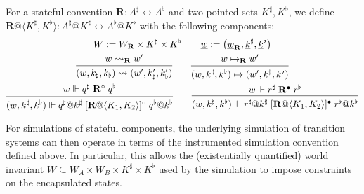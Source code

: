 \documentclass[acmsmall,screen,review,anonymous]{acmart}
\newcommand{\que}{\circ}
\newcommand{\ans}{\bullet}
\newcommand{\intl}[1]{\underline{#1}}
\begin{document}
\begin{definition} \label{def:liftsconv} %
For a stateful convention
$\mathbf{R} : A^\sharp \leftrightarrow A^\flat$
and two pointed sets $K^\sharp, K^\flat$, 
we define %
$\mathbf{R}@\langle K^\sharp,K^\flat \rangle :
   A^\sharp@K^\sharp \leftrightarrow A^\flat@K^\flat$
with the following components:
\begin{gather*}
  W := W_\mathbf{R} \times K^\sharp \times K^\flat
  \qquad
  \intl{w} := \big( \intl{w}_\mathbf{R}, \intl{k}^\sharp, \intl{k}^\flat \big)
  \\
 {\begin{prooftree}
    \hypo{w \leadsto_\mathbf{R} w'}
    \infer1{(w, k_\sharp, k_\flat) \leadsto (w', k_\sharp', k_\flat')}
  \end{prooftree}}
  \qquad
 {\begin{prooftree}
    \hypo{w \mapsto_\mathbf{R} w'}
    \infer1{(w, k^\sharp, k^\flat) \mapsto (w', k^\sharp, k^\flat)}
  \end{prooftree}}
  \\
 {\begin{prooftree}
    \hypo{w \Vdash q^\sharp \mathrel{\mathbf{R}^\que}
                   q^\flat}
    \infer1{
      (w, k^\sharp, k^\flat) \Vdash
      q^\sharp@k^\sharp
      \mathrel{[\mathbf{R}@\langle K_1, K_2 \rangle]^\que}
      q^\flat@k^\flat}
  \end{prooftree}}
  \qquad
 {\begin{prooftree}
    \hypo{w \Vdash r^\sharp \mathrel{\mathbf{R}^\ans}
                   r^\flat}
    \infer1{
      (w, k^\sharp, k^\flat) \Vdash
      r^\sharp@k^\sharp
      \mathrel{[\mathbf{R}@\langle K_1, K_2 \rangle]^\ans}
      r^\flat@k^\flat}
  \end{prooftree}}
\end{gather*}
\end{definition}

For simulations of stateful components,
the underlying simulation of transition systems
can then operate in terms
of the instrumented simulation convention defined above.
In particular, this allows
the (existentially quantified) world invariant
$W \subseteq W_A \times W_B \times K^\sharp \times K^\flat$
used by the simulation
to impose constraints on the encapsulated states.
\end{document}
